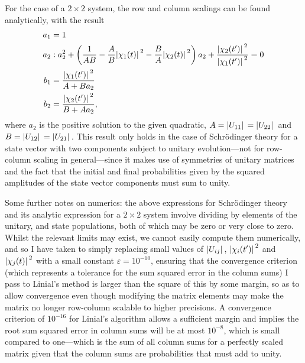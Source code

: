 For the case of a $2\times2$ system, the row and column scalings can be found analytically, with the result
\begin{align}
a_1 &= 1\\
a_2 &: a_2^2 + 
\left(\frac1{AB} - \frac AB \abs{\chi_1(t)}^2 - \frac BA \abs{\chi_2(t)}^2\right)a_2
+ \frac{\abs{\chi_2(t^\prime)}^2}{\abs{\chi_1(t^\prime)}^2} = 0\\
b_1 &= \frac{\abs{\chi_1(t^\prime)}^2}{A + B a_2}\\
b_2 &= \frac{\abs{\chi_2(t^\prime)}^2}{B + A a_2},
\end{align}
where $a_2$ is the positive solution to the given quadratic, $A = \abs{U_{11}} = \abs{U_{22}}$ and $B = \abs{U_{12}} = \abs{U_{21}}$. This result only holds in the case of Schr\"odinger theory for a state vector with two components subject to unitary evolution---not for row-column scaling in general---since it makes use of symmetries of unitary matrices and the fact that the initial and final probabilities given by the squared amplitudes of the state vector components must sum to unity.

Some further notes on numerics: the above expressions for Schr\"odinger theory and its analytic expression for a $2\times2$ system involve dividing by elements of the unitary, and state populations, both of which may be zero or very close to zero. Whilst the relevant limits may exist, we cannot easily compute them numerically, and so I have taken to simply replacing small values of $\abs{U_{ij}}$, $\abs{\chi_i(t^\prime)}^2$ and $\abs{\chi_j(t)}^2$ with a small constant $\varepsilon=10^{-10}$, ensuring that the convergence criterion (which represents a tolerance for the sum squared error in the column sums) I pass to Linial's method is larger than the square of this by some margin, so as to allow convergence even though modifying the matrix elements may make the matrix no longer row-column scalable to higher precisions. A convergence criterion of $10^{-16}$ for Linial's algorithm allows a sufficient margin and implies the root sum squared error in column sums will be at most $10^{-8}$, which is small compared to one---which is the sum of all column sums for a perfectly scaled matrix given that the column sums are probabilities that must add to unity.

